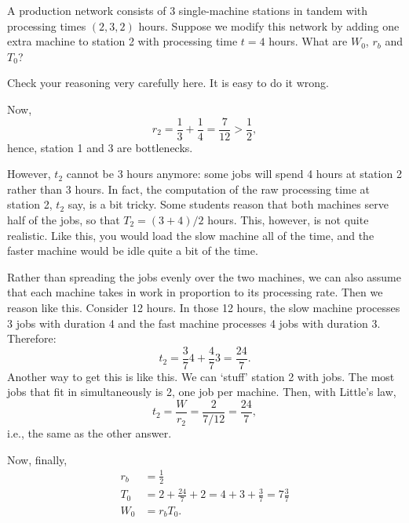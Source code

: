\begin{exercise}
 A production network consists of 3 single-machine stations in tandem
 with processing times $(2, 3, 2)$ hours. Suppose we modify this
 network by adding one extra machine to station 2 with
 processing time $t=4$ hours. What are $W_0$, $r_b$ and $T_0$?
\begin{hint}
Check your reasoning very carefully here. It is easy to do it wrong.
\end{hint}
\begin{solution}
Now, 
\begin{equation*}
 r_2 = \frac13 + \frac 14 = \frac 7{12} > \frac12,
\end{equation*}
hence, station 1 and 3 are bottlenecks. 


However, $t_2$ cannot be $3$ hours anymore: some jobs will spend 4
hours at station 2 rather than 3 hours. In fact, the computation of
the raw processing time at station 2, $t_2$ say, is a bit tricky. Some
students reason that both machines serve half of the jobs, so that
$T_2=(3+4)/2$ hours. This, however, is not quite realistic. Like
this, you would load the slow machine all of the time, and the faster
machine would be idle quite a bit of the time. 


 Rather than spreading the jobs evenly over the two machines, we can
 also assume that each machine takes in work in proportion to its
 processing rate. Then we reason like this. Consider 12 hours. In
 those 12 hours, the slow machine processes 3 jobs with duration 4
 and the fast machine processes 4 jobs with duration 3. Therefore:
 \begin{equation*}
 t_2 = \frac 3 7 4 + \frac 4 7 3 = \frac{24}7.
 \end{equation*}
 Another way to get this is like this. We can `stuff' station 2 with
 jobs. The most jobs that fit in simultaneously is 2, one job per
 machine. Then, with Little's law,
 \begin{equation*}
 t_2 = \frac{W}{r_2} = \frac{2}{7/12} = \frac{24}7,
 \end{equation*}
i.e., the same as the other answer.

Now, finally, 
 \begin{align*}
 r_b &= \frac12 \\
 T_0 &= 2 + \frac{24}7 + 2 = 4 + 3 + \frac37 = 7 \frac37\\
 W_0 &= r_b T_0.
 \end{align*}


\end{solution}
\end{exercise}
